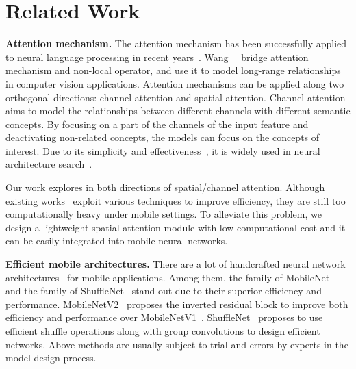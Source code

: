 \documentclass[10pt,twocolumn,letterpaper]{article}
\begin{document}
\section{Related Work}
\noindent\textbf{Attention mechanism.}
The attention mechanism has been successfully applied to neural language processing in recent years~\cite{bahadnau2015joint_align, vaswani2017attention, devlin2019bert}. 
Wang~\etal ~\cite{wang2018non} bridge attention mechanism and non-local operator, and use it to model long-range relationships in computer vision applications.
Attention mechanisms can be applied along two orthogonal directions: channel attention and spatial attention. Channel attention~\cite{hu2018se,wang2017residual_attention,park2018bottleneck_attention} aims to model the relationships between different channels with different semantic concepts. By focusing on a part of the channels of the input feature and deactivating non-related concepts, the models can focus on the concepts of interest. Due to its simplicity and effectiveness~\cite{hu2018se}, it is widely used in neural architecture search~\cite{tan2019mnasnet,tan2019mixnet,howard2019searching,chu2019scarletnas}.

Our work explores in both directions of spatial/channel attention. Although existing works~\cite{chen20182,yue2018compact,cao2019gcnet,bello2019attention,wang2020axial} exploit various techniques to improve efficiency, they are still too computationally heavy under mobile settings. To alleviate this problem, we design a lightweight spatial attention module with low computational cost and it can be easily integrated into mobile neural networks.

\vspace{0.5ex}\noindent\textbf{Efficient mobile architectures.}
There are a lot of handcrafted neural network architectures~\cite{huang2017condensenet,IGCV2,howard2017mobilenets,sandler2018mobilenetv2,zhang2018shufflenet,ma2018shufflenet} for mobile applications. Among them, the family of MobileNet~\cite{howard2017mobilenets,sandler2018mobilenetv2} and the family of ShuffleNet~\cite{zhang2018shufflenet,ma2018shufflenet} stand out due to their superior efficiency and performance. 
MobileNetV2~\cite{sandler2018mobilenetv2} proposes the inverted residual block to improve both efficiency and performance over MobileNetV1~\cite{howard2017mobilenets}. ShuffleNet~\cite{ma2018shufflenet} proposes to use efficient shuffle operations along with group convolutions to  design efficient networks. Above methods are usually subject to trial-and-errors by experts in the model design process.
\end{document}
